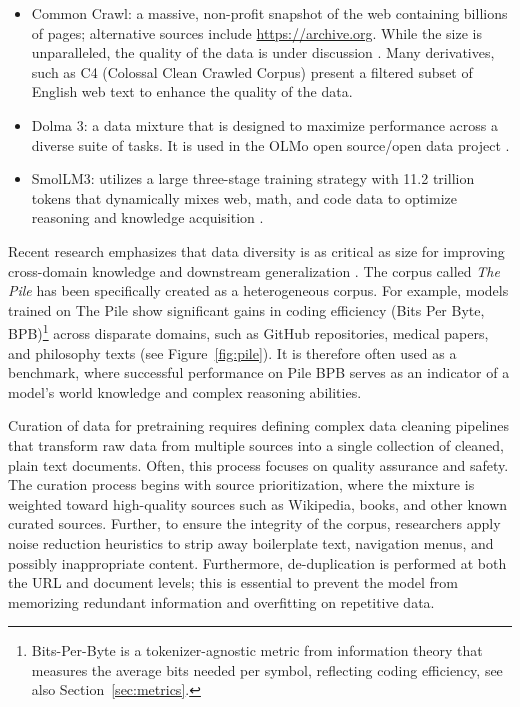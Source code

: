 \begin{itemize}
    \item Common Crawl:  a massive, non-profit snapshot of the web containing billions of pages; alternative sources include \url{https://archive.org}. While the size is unparalleled, the quality of the data is under discussion \citep{baack2024critical}. Many derivatives, such as C4 (Colossal Clean Crawled Corpus) present a filtered subset of English web text \citep{raffel2020exploringc4} to  enhance the quality of the data.
    \item Dolma 3:  a data mixture that is  designed to maximize performance across a diverse suite of tasks. It is used in the OLMo open source/open data project \citep{olmo2025olmo3, soldaini2024dolma}.
    \item SmolLM3:  utilizes a large three-stage training strategy with 11.2 trillion tokens that dynamically mixes web, math, and code data to optimize reasoning and knowledge acquisition \citep{bakouch2025smollm3}.
\end{itemize}
%
Recent research emphasizes that data diversity is as critical as size for improving cross-domain knowledge and downstream generalization \citep{gao2020pile800gbdatasetdiverse}. The corpus called {\em The Pile} has been specifically created as a heterogeneous corpus. For example,  models trained on The Pile show significant gains in coding efficiency (Bits Per Byte, BPB)\footnote{Bits-Per-Byte is a tokenizer-agnostic metric from information theory that measures the average bits needed per symbol, reflecting coding efficiency, see also Section~\ref{sec:metrics}.} across disparate domains, such as GitHub repositories, medical papers, and philosophy texts (see Figure~\ref{fig:pile}). It is therefore often used as a benchmark, where successful performance on Pile BPB serves as an indicator of a model's world knowledge and complex reasoning abilities. 

Curation of data for pretraining requires defining complex data cleaning pipelines that transform raw data from multiple sources into a single collection of cleaned, plain text documents. Often, this process focuses on quality assurance and safety. The curation process begins with source prioritization, where the mixture is  weighted toward high-quality sources such as Wikipedia, books, and other known curated sources. Further, to ensure the integrity of the corpus, researchers apply noise reduction heuristics to strip away boilerplate text, navigation menus, and possibly inappropriate content. Furthermore, de-duplication is performed at both the URL and document levels; this is essential to prevent the model from memorizing redundant information and overfitting on repetitive data.

